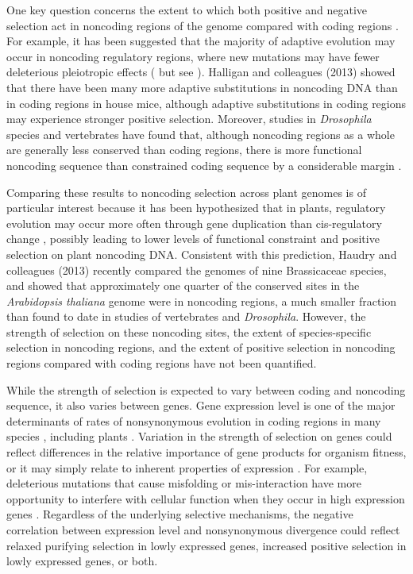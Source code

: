 One key question concerns the extent to which both positive and negative selection act in noncoding regions of the genome compared with coding regions \citep{andolfatto2005, hough2013, zhen2012, Halligan2013}. For example, it has been suggested that the majority of adaptive evolution may occur in noncoding regulatory regions, where new mutations may have fewer deleterious pleiotropic effects (\citealt{wray2007, carroll2005} but see \citealt{hoekstra2007}). Halligan and colleagues (2013) showed that there have been many more adaptive substitutions in noncoding DNA than in coding regions in house mice, although adaptive substitutions in coding regions may experience stronger positive selection. Moreover, studies in \textit{Drosophila} species and vertebrates have found that, although noncoding regions as a whole are generally less conserved than coding regions, there is more functional noncoding sequence than constrained coding sequence by a considerable margin \citep{andolfatto2005,keightley2003}. 

Comparing these results to noncoding selection across plant genomes is of particular interest because it has been hypothesized that in plants, regulatory evolution may occur more often through gene duplication than cis-regulatory change \citep{lockton2005}, possibly leading to lower levels of functional constraint and positive selection on plant noncoding DNA. Consistent with this prediction, Haudry and colleagues (2013) recently compared the genomes of nine Brassicaceae species, and showed that approximately one quarter of the conserved sites in the \textit{Arabidopsis thaliana} genome were in noncoding regions, a much smaller fraction than found to date in studies of vertebrates and \textit{Drosophila}. However, the strength of selection on these noncoding sites, the extent of species-specific selection in noncoding regions, and the extent of positive selection in noncoding regions compared with coding regions have not been quantified. 

While the strength of selection is expected to vary between coding and noncoding sequence, it also varies between genes. Gene expression level is one of the major determinants of rates of nonsynonymous evolution in coding regions in many species \citep{pal2001,subramanian2004,drummond2006}, including plants \citep{yang2011, slotte2011genomic, paape2013, renaut2012}. Variation in the strength of selection on genes could reflect differences in the relative importance of gene products for organism fitness, or it may simply relate to inherent properties of expression \citep{gaut2011}. For example, deleterious mutations that cause misfolding or mis-interaction have more opportunity to interfere with cellular function when they occur in high expression genes \citep{park2013,yang2012,drummond2008}. Regardless of the underlying selective mechanisms, the negative correlation between expression level and nonsynonymous divergence could reflect relaxed purifying selection in lowly expressed genes, increased positive selection in lowly expressed genes, or both.

